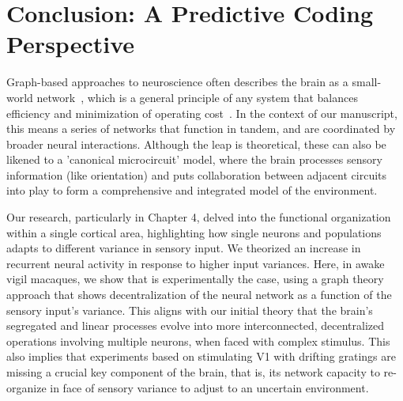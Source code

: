 



\section{Conclusion: A Predictive Coding Perspective}
Graph-based approaches to neuroscience often describes the brain as a small-world network~\cite{liao2017small}, which is a general principle of any system that balances efficiency and minimization of operating cost~\cite{sterling2015principles}. In the context of our manuscript, this means a series of networks that function in tandem, and are coordinated by broader neural interactions. Although the leap is theoretical, these can also be likened to a 'canonical microcircuit' model, where the brain processes sensory information (like orientation) and puts collaboration between adjacent circuits into play to form a comprehensive and integrated model of the environment.

Our research, particularly in Chapter 4, delved into the functional organization within a single cortical area, highlighting how single neurons and populations adapts to different variance in sensory input. We theorized an increase in recurrent neural activity in response to higher input variances.  Here, in awake vigil macaques, we show that is experimentally the case, using a graph theory approach that shows decentralization of the neural network as a function of the sensory input's variance. This aligns with our initial theory that the brain's segregated and linear processes evolve into more interconnected, decentralized operations involving multiple neurons, when faced with complex stimulus. This also implies that experiments based on stimulating \gls{V1} with drifting gratings are missing a crucial key component of the brain, that is, its network capacity to re-organize in face of sensory variance to adjust to an uncertain environment. 

